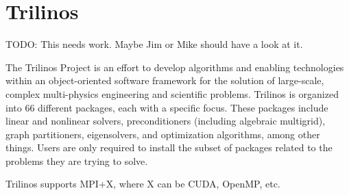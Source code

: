 \section{Trilinos}

{\color{red}TODO: This needs work.  Maybe Jim or Mike should have a look at it.}

The Trilinos Project is an effort to develop algorithms and enabling
technologies within an object-oriented software framework for the solution of
large-scale, complex multi-physics engineering and scientific problems. Trilinos
is organized into 66 different packages, each with a specific focus.  These
packages include linear and nonlinear solvers, preconditioners (including
algebraic multigrid), graph partitioners, eigensolvers, and optimization
algorithms, among other things.  Users are only required to install the subset
of packages related to the problems they are trying to solve.

Trilinos supports MPI+X, where X can be CUDA, OpenMP, etc.